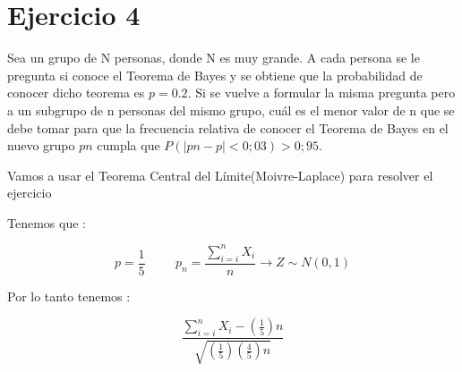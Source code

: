 \documentclass[10pt]{article}
\begin{document}
	\section*{Ejercicio 4 }

	\begin{flushleft}
		Sea un grupo de N personas, donde N es muy grande. A cada persona se le pregunta si conoce el Teorema de Bayes y se obtiene que la probabilidad de conocer dicho teorema es $p = 0.2$. Si se vuelve a formular la misma pregunta pero a un subgrupo de n personas del mismo grupo, cu\'al es el menor valor de n que se debe tomar para que la frecuencia relativa de conocer el Teorema de Bayes en el nuevo grupo $pn$ cumpla que $P(|pn - p| < 0;03) > 0;95$.
	\end{flushleft}
	
	\begin{flushleft}
		Vamos a usar el Teorema Central del L\'imite(Moivre-Laplace) para resolver el ejercicio 
	\end{flushleft}
	
	\begin{flushleft}
		Tenemos que  : 
	\end{flushleft}
	
	\begin{equation*}
		p=\frac{1}{5}  \hspace{1cm} p_n=\frac{\sum_{i=i}^{n}X_i}{n} \rightarrow Z \sim N\left(0,1\right)
	\end{equation*}
	

	\begin{flushleft}
		Por lo tanto tenemos : 
	\end{flushleft}

	\begin{equation*}
		\displaystyle \frac{\sum_{i=i}^{n}X_i-\left(\frac{1}{5}\right)n}{\sqrt{\left(\frac{1}{5}\right)\left(\frac{4}{5}\right)n}}
	\end{equation*}
\end{document}
